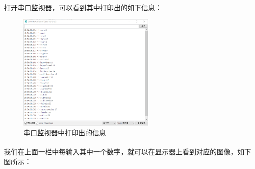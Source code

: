 \documentclass[UTF8, oneside]{ctexbook}
\begin{document}
\paragraph{}
打开串口监视器，可以看到其中打印出的如下信息：
\begin{figure}[h]
    \centering
    \includegraphics[width=0.6\textwidth]{./result/sensor/2/result1.png}
    \caption{串口监视器中打印出的信息}
    \label{s2_1}
\end{figure}

\paragraph{}
我们在上面一栏中每输入其中一个数字，就可以在显示器上看到对应的图像，如下图所示：
\end{document}
